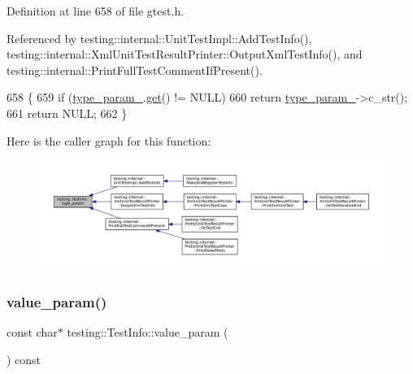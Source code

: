 Definition at line 658 of file gtest.\+h.



Referenced by testing\+::internal\+::\+Unit\+Test\+Impl\+::\+Add\+Test\+Info(), testing\+::internal\+::\+Xml\+Unit\+Test\+Result\+Printer\+::\+Output\+Xml\+Test\+Info(), and testing\+::internal\+::\+Print\+Full\+Test\+Comment\+If\+Present().


\begin{DoxyCode}
658                                  \{
659     \textcolor{keywordflow}{if} (\hyperlink{classtesting_1_1TestInfo_ab4f53cfaf59e1b5cac858a9322697e88}{type\_param\_}.\hyperlink{classtesting_1_1internal_1_1scoped__ptr_aa5984291e12453f1e81b7676d1fa26fd}{get}() != NULL)
660       \textcolor{keywordflow}{return} \hyperlink{classtesting_1_1TestInfo_ab4f53cfaf59e1b5cac858a9322697e88}{type\_param\_}->c\_str();
661     \textcolor{keywordflow}{return} NULL;
662   \}
\end{DoxyCode}
Here is the caller graph for this function\+:
\nopagebreak
\begin{figure}[H]
\begin{center}
\leavevmode
\includegraphics[width=350pt]{classtesting_1_1TestInfo_a7759bc57f4350ad406cbbb0b3bcea320_icgraph}
\end{center}
\end{figure}
\mbox{\label{classtesting_1_1TestInfo_abdf2c6cfcf4819e725816c64e1c1fc24}} 
\subsubsection{\texorpdfstring{value\+\_\+param()}{value\_param()}}
{\footnotesize\ttfamily const char$\ast$ testing\+::\+Test\+Info\+::value\+\_\+param (\begin{DoxyParamCaption}{ }\end{DoxyParamCaption}) const\hspace{0.3cm}{\ttfamily [inline]}}



